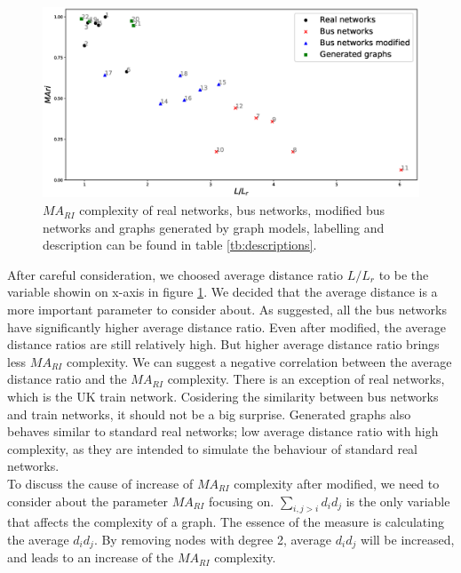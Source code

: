 \documentclass[12pt]{article}
\begin{document}
\begin{figure}[ht]
    \includegraphics[width = \textwidth]{real_networks.eps}
    \caption{$MA_{RI}$ complexity of real networks, bus networks, modified bus networks and graphs generated by graph models, labelling and description can be found in table \ref{tb:descriptions}.}
    \label{fig:real_networks}
\end{figure}
After careful consideration, we choosed average distance ratio $L/L_r$ to be the variable showin on x-axis in figure \ref{fig:real_networks}. We decided that the average distance is a more important parameter to consider about. As suggested, all the bus networks have significantly higher average distance ratio. Even after modified, the average distance ratios are still relatively high. But higher average distance ratio brings less $MA_{RI}$ complexity. We can suggest a negative correlation between the average distance ratio and the $MA_{RI}$ complexity. There is an exception of real networks, which is the UK train network. Cosidering the similarity between bus networks and train networks, it should not be a big surprise. Generated graphs also behaves similar to standard real networks; low average distance ratio with high complexity, as they are intended to simulate the behaviour of standard real networks.\\
To discuss the cause of increase of $MA_{RI}$ complexity after modified, we need to consider about the parameter $MA_{RI}$ focusing on. $\sum_{i,j>i}d_id_j$ is the only variable that affects the complexity of a graph. The essence of the measure is calculating the average $d_id_j$. By removing nodes with degree 2, average $d_id_j$ will be increased, and leads to an increase of the $MA_{RI}$ complexity.
\end{document}
